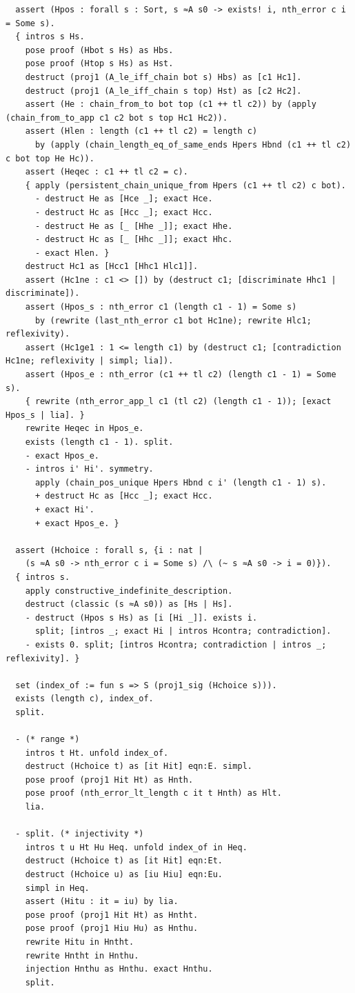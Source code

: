 \begin{latin}
\begin{verbatim}
  assert (Hpos : forall s : Sort, s ≈A s0 -> exists! i, nth_error c i = Some s).
  { intros s Hs.
    pose proof (Hbot s Hs) as Hbs.
    pose proof (Htop s Hs) as Hst.
    destruct (proj1 (A_le_iff_chain bot s) Hbs) as [c1 Hc1].
    destruct (proj1 (A_le_iff_chain s top) Hst) as [c2 Hc2].
    assert (He : chain_from_to bot top (c1 ++ tl c2)) by (apply (chain_from_to_app c1 c2 bot s top Hc1 Hc2)).
    assert (Hlen : length (c1 ++ tl c2) = length c)
      by (apply (chain_length_eq_of_same_ends Hpers Hbnd (c1 ++ tl c2) c bot top He Hc)).
    assert (Heqec : c1 ++ tl c2 = c).
    { apply (persistent_chain_unique_from Hpers (c1 ++ tl c2) c bot).
      - destruct He as [Hce _]; exact Hce.
      - destruct Hc as [Hcc _]; exact Hcc.
      - destruct He as [_ [Hhe _]]; exact Hhe.
      - destruct Hc as [_ [Hhc _]]; exact Hhc.
      - exact Hlen. }
    destruct Hc1 as [Hcc1 [Hhc1 Hlc1]].
    assert (Hc1ne : c1 <> []) by (destruct c1; [discriminate Hhc1 | discriminate]).
    assert (Hpos_s : nth_error c1 (length c1 - 1) = Some s)
      by (rewrite (last_nth_error c1 bot Hc1ne); rewrite Hlc1; reflexivity).
    assert (Hc1ge1 : 1 <= length c1) by (destruct c1; [contradiction Hc1ne; reflexivity | simpl; lia]).
    assert (Hpos_e : nth_error (c1 ++ tl c2) (length c1 - 1) = Some s).
    { rewrite (nth_error_app_l c1 (tl c2) (length c1 - 1)); [exact Hpos_s | lia]. }
    rewrite Heqec in Hpos_e.
    exists (length c1 - 1). split.
    - exact Hpos_e.
    - intros i' Hi'. symmetry.
      apply (chain_pos_unique Hpers Hbnd c i' (length c1 - 1) s).
      + destruct Hc as [Hcc _]; exact Hcc.
      + exact Hi'.
      + exact Hpos_e. }

  assert (Hchoice : forall s, {i : nat |
    (s ≈A s0 -> nth_error c i = Some s) /\ (~ s ≈A s0 -> i = 0)}).
  { intros s.
    apply constructive_indefinite_description.
    destruct (classic (s ≈A s0)) as [Hs | Hs].
    - destruct (Hpos s Hs) as [i [Hi _]]. exists i.
      split; [intros _; exact Hi | intros Hcontra; contradiction].
    - exists 0. split; [intros Hcontra; contradiction | intros _; reflexivity]. }

  set (index_of := fun s => S (proj1_sig (Hchoice s))).
  exists (length c), index_of.
  split.

  - (* range *)
    intros t Ht. unfold index_of.
    destruct (Hchoice t) as [it Hit] eqn:E. simpl.
    pose proof (proj1 Hit Ht) as Hnth.
    pose proof (nth_error_lt_length c it t Hnth) as Hlt.
    lia.

  - split. (* injectivity *)
    intros t u Ht Hu Heq. unfold index_of in Heq.
    destruct (Hchoice t) as [it Hit] eqn:Et.
    destruct (Hchoice u) as [iu Hiu] eqn:Eu.
    simpl in Heq.
    assert (Hitu : it = iu) by lia.
    pose proof (proj1 Hit Ht) as Hntht.
    pose proof (proj1 Hiu Hu) as Hnthu.
    rewrite Hitu in Hntht.
    rewrite Hntht in Hnthu.
    injection Hnthu as Hnthu. exact Hnthu.
    split.


\end{verbatim}
\end{latin}
